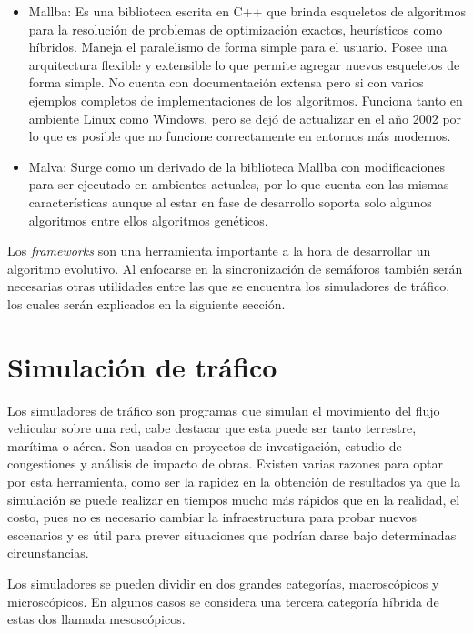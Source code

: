 \begin{itemize}
	\item Mallba: Es una biblioteca escrita en C++ que brinda esqueletos de algoritmos para la resolución de problemas de optimización exactos, heurísticos como híbridos. Maneja el paralelismo de forma simple para el usuario. Posee una arquitectura flexible y extensible lo que permite agregar nuevos esqueletos de forma simple. No cuenta con documentación extensa pero si con varios ejemplos completos de implementaciones de los algoritmos. Funciona tanto en ambiente Linux como Windows, pero se dejó de actualizar en el año 2002 por lo que es posible que no funcione correctamente en entornos más modernos. \citep{Mallba}
	
	\item Malva: Surge como un derivado de la biblioteca Mallba con modificaciones para ser ejecutado en ambientes actuales, por lo que cuenta con las mismas características aunque al estar en fase de desarrollo soporta solo algunos algoritmos entre ellos algoritmos genéticos. \citep{Malva}
\end{itemize}

Los \emph{frameworks} son una herramienta importante a la hora de desarrollar un algoritmo evolutivo. Al enfocarse en la sincronización de semáforos también serán necesarias otras utilidades entre las que se encuentra los simuladores de tráfico, los cuales serán explicados en la siguiente sección.


\section{Simulación de tráfico}

Los simuladores de tráfico son programas que simulan el movimiento del flujo vehicular sobre una red, cabe destacar que esta puede ser tanto terrestre, marítima o aérea. Son usados en proyectos de investigación, estudio de congestiones y análisis de impacto de obras.  Existen varias razones para optar por esta herramienta, como ser la rapidez en la obtención de resultados ya que la simulación se puede realizar en tiempos mucho más rápidos que en la realidad, el costo, pues no es necesario cambiar la infraestructura para probar nuevos escenarios y es útil para prever situaciones que podrían darse bajo determinadas circunstancias.

Los simuladores se pueden dividir en dos grandes categorías, macroscópicos y microscópicos. En algunos casos se considera una tercera categoría híbrida de estas dos llamada mesoscópicos.

